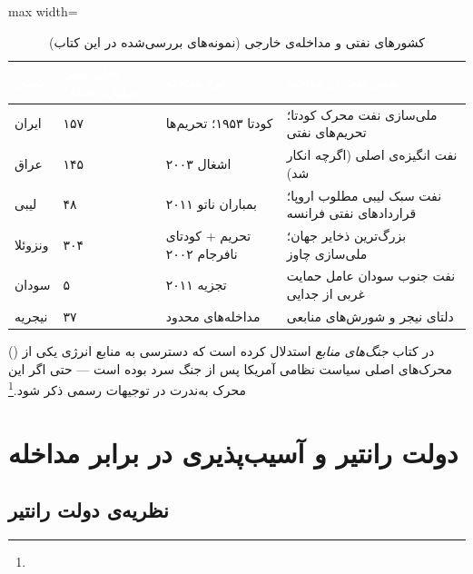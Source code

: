 \begin{table}[htbp]
\centering
\caption{کشورهای نفتی و مداخله‌ی خارجی (نمونه‌های بررسی‌شده در این کتاب)}
\label{tab:ch12-oil-intervention}
\begin{adjustbox}{max width=\linewidth}
\begin{tabularx}{\linewidth}{
    >{\raggedleft\arraybackslash}p{2.5cm}
    >{\centering\arraybackslash}p{2.5cm}
    >{\raggedleft\arraybackslash}p{3cm}
    >{\raggedleft\arraybackslash}X
}
\toprule
\rowcolor{PrimaryDeep}
\textcolor{white}{\textbf{کشور}} &
\textcolor{white}{\textbf{ذخایر نفتی (میلیارد بشکه)}} &
\textcolor{white}{\textbf{نوع مداخله}} &
\textcolor{white}{\textbf{نقش نفت در مداخله}} \\
\midrule
ایران & ۱۵۷ & کودتا ۱۹۵۳؛ تحریم‌ها & ملی‌سازی نفت محرک کودتا؛ تحریم‌های نفتی \\
\rowcolor{NeutralLight}
عراق & ۱۴۵ & اشغال ۲۰۰۳ & نفت انگیزه‌ی اصلی (اگرچه انکار شد) \\
لیبی & ۴۸ & بمباران ناتو ۲۰۱۱ & نفت سبک لیبی مطلوب اروپا؛ قراردادهای نفتی فرانسه \\
\rowcolor{NeutralLight}
ونزوئلا & ۳۰۴ & تحریم + کودتای نافرجام ۲۰۰۲ & بزرگ‌ترین ذخایر جهان؛ ملی‌سازی چاوز \\
سودان & ۵ & تجزیه ۲۰۱۱ & نفت جنوب سودان عامل حمایت غربی از جدایی \\
\rowcolor{NeutralLight}
نیجریه & ۳۷ & مداخله‌های محدود & دلتای نیجر و شورش‌های منابعی \\
\bottomrule
\end{tabularx}
\end{adjustbox}
\end{table}

 () در کتاب \textit{جنگ‌های منابع} استدلال کرده است که دسترسی به منابع انرژی یکی از محرک‌های اصلی سیاست نظامی آمریکا پس از جنگ سرد بوده است — حتی اگر این محرک به‌ندرت در توجیهات رسمی ذکر شود.\footnote{}


\section{دولت رانتیر و آسیب‌پذیری در برابر مداخله}
\label{sec:ch12-rentier}

\subsection{نظریه‌ی دولت رانتیر}
\label{subsec:ch12-rentier-theory}

